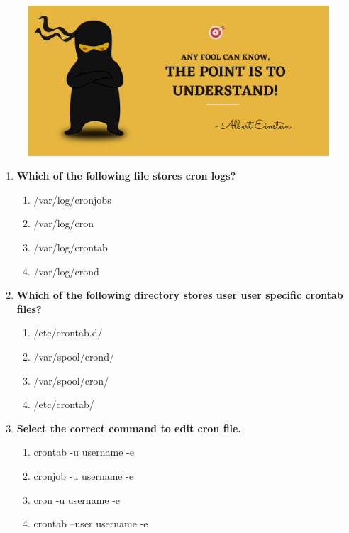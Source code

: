 \setlength{\columnsep}{3pt}
\begin{flushleft}
	
	\paragraph{}
	\bigskip
	
	\begin{figure}[h!]
		\centering
		\includegraphics[scale=.2]{content/practise.jpg}
	\end{figure}	
	\begin{enumerate}
		
		\item \textbf{Which of the following file stores cron logs?}
		\begin{enumerate}[label=(\alph*)]
			\item /var/log/cronjobs
			\item /var/log/cron %
			\item /var/log/crontab
			\item /var/log/crond
		\end{enumerate}
		\bigskip
		\bigskip
		
		\item \textbf{Which of the following directory stores user user specific crontab files?}
		\begin{enumerate}[label=(\alph*)]
			\item /etc/crontab.d/
			\item /var/spool/crond/
			\item /var/spool/cron/  %
			\item /etc/crontab/
		\end{enumerate}
		\bigskip
		\bigskip	
		
		\item \textbf{Select the correct command to edit cron file.}
		\begin{enumerate}[label=(\alph*)]
			\item crontab -u username -e %
			\item cronjob -u username -e
			\item cron -u username -e
			\item crontab --user username -e
		\end{enumerate}
		\bigskip
		\bigskip	


\end{enumerate}
\end{flushleft}
